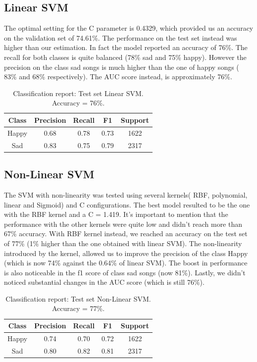 \subsection{Linear SVM}
The optimal setting for the C parameter is 0.4329, which provided us an accuracy on the validation set of 74.61\%. The performance on the test set instead was higher than our estimation. In fact the model reported an accuracy of 76\%. The recall for both classes is quite balanced (78\% sad and 75\% happy). However the precision on the class sad songs is much higher than the one of happy songs ( 83\% and 68\% respectively). The AUC score instead, is approximately 76\%. 

\begin{table}[!htb]
\centering
\begin{tabular}{ccccc}
\hline
\textbf{Class} & \textbf{Precision} & \textbf{Recall} & \textbf{F1} & \textbf{Support} \\ \hline
Happy          & 0.68               & 0.78            & 0.73        & 1622             \\ \hline
Sad            & 0.83               & 0.75            & 0.79        & 2317            
\end{tabular}
\caption{Classification report: Test set Linear SVM.\\ Accuracy = 76\%. }
\label{Classification report: Test set Linear SVM}
\end{table}

\subsection{Non-Linear SVM}
The SVM with non-linearity was tested using several kernels( RBF, polynomial, linear and Sigmoid) and C configurations. The best model resulted to be the one with the RBF kernel and a C = 1.419. It's important to mention that the performance with the other kernels were quite low and didn't reach more than 67\% accuracy. 
With RBF kernel instead, we reached an accuracy on the test set of 77\% (1\% higher than the one obtained with linear SVM). The non-linearity introduced by the kernel, allowed us to improve the precision of the class Happy (which is now 74\% against the 0.64\% of linear SVM). The boost in performance is also noticeable in the f1 score of class sad songs (now 81\%).
Lastly, we didn't noticed substantial changes in the AUC score (which is still 76\%). 
\\
\begin{table}[!htb]
\centering
\begin{tabular}{ccccc}
\hline
\textbf{Class} & \textbf{Precision} & \textbf{Recall} & \textbf{F1} & \textbf{Support} \\ \hline
Happy          & 0.74               & 0.70            & 0.72        & 1622             \\ \hline
Sad            & 0.80               & 0.82            & 0.81        & 2317            
\end{tabular}
\caption{Classification report: Test set Non-Linear SVM.\\ Accuracy = 77\%. }
\label{Classification report: Test set Non-Linear SVM}
\end{table}

